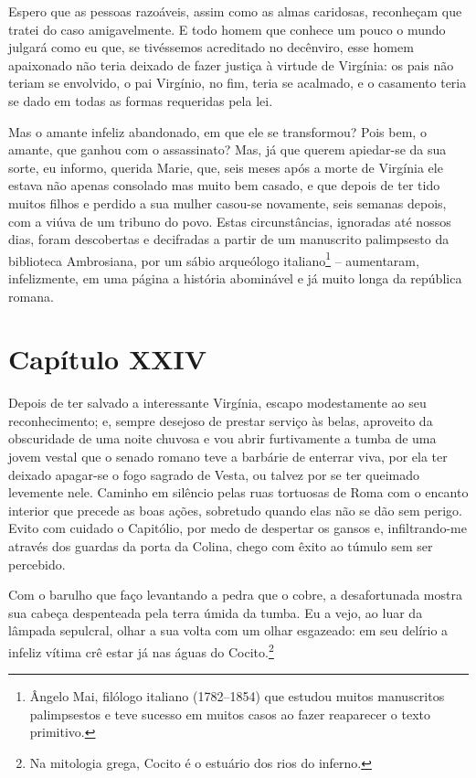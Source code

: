  Espero que as pessoas razoáveis, assim como as almas caridosas,
reconheçam que tratei do caso amigavelmente. E todo homem que conhece
um pouco o mundo julgará como eu que, se tivéssemos acreditado no
decênviro, esse homem apaixonado não teria deixado de fazer justiça à
virtude de Virgínia: os pais não teriam se envolvido, o pai Virgínio,
no fim, teria se acalmado, e o casamento teria se dado em todas as
formas requeridas pela lei.

 Mas o amante infeliz abandonado, em que ele se transformou? Pois bem, o
amante, que ganhou com o assassinato? Mas, já que querem apiedar-se da
sua sorte, eu informo, querida Marie, que, seis meses após a morte de
Virgínia ele estava não apenas consolado mas muito bem casado, e que
depois de ter tido muitos filhos e perdido a sua mulher casou-se
novamente, seis semanas depois, com a viúva de um tribuno do povo.
Estas circunstâncias, ignoradas até nossos dias, foram descobertas e
decifradas a partir de um manuscrito palimpsesto da biblioteca
Ambrosiana, por um sábio arqueólogo italiano\footnote{ Ângelo Mai,
filólogo italiano (1782--1854) que estudou muitos manuscritos
palimpsestos e teve sucesso em muitos casos ao fazer reaparecer o texto
primitivo.} -- aumentaram, infelizmente, em uma página a história
abominável e já muito longa da república romana. 

\section*{Capítulo XXIV}

 Depois de ter salvado a interessante Virgínia, escapo modestamente ao
seu reconhecimento; e, sempre desejoso de prestar serviço às belas,
aproveito da obscuridade de uma noite chuvosa e vou abrir furtivamente
a tumba de uma jovem vestal que o senado romano teve a barbárie de
enterrar viva, por ela ter deixado apagar-se o fogo sagrado de Vesta,
ou talvez por se ter queimado levemente nele. Caminho em silêncio pelas
ruas tortuosas de Roma com o encanto interior que precede as boas
ações, sobretudo quando elas não se dão sem perigo. Evito com cuidado o
Capitólio, por medo de despertar os gansos e, infiltrando-me através
dos guardas da porta da Colina, chego com êxito ao túmulo sem ser
percebido.

 Com o barulho que faço levantando a pedra que o cobre, a desafortunada
mostra sua cabeça despenteada pela terra úmida da tumba. Eu a vejo, ao
luar da lâmpada sepulcral, olhar a sua volta com um olhar esgazeado: em
seu delírio a infeliz vítima crê estar já nas águas do Cocito.\footnote{ Na 
mitologia grega, Cocito é o estuário dos rios do inferno.}

